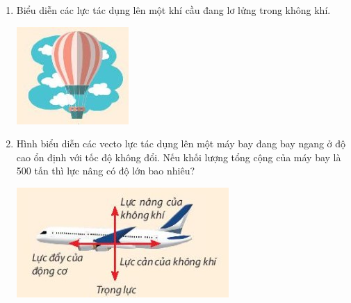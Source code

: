 \begin{enumerate}[label=\bfseries Câu \arabic*:]
		\item {}
	
	{
		Biểu diễn các lực tác dụng lên một khí cầu đang lơ lửng trong không khí.
		\begin{center}
			\includegraphics[scale=1]{../figs/VN10-2022-PH-TP020-1.jpg}
		\end{center}
	}
	
		\item {}
	
	{
		Hình biểu diễn các vecto lực tác dụng lên một máy bay đang bay ngang ở độ cao ổn định với tốc độ không đổi. Nếu khối lượng tổng cộng của máy bay là 500 tấn thì lực nâng có độ lớn bao nhiêu?
		\begin{center}
			\includegraphics[scale=1]{../figs/VN10-2022-PH-TP020-2.jpg}
		\end{center}
	}
	

\end{enumerate}
